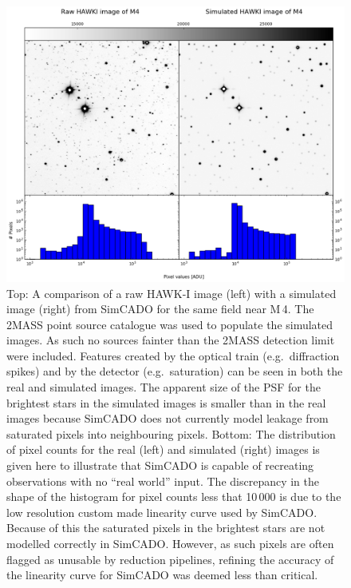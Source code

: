 \begin{figure}

    \centering
    \includegraphics[width=\textwidth]{images/hawki_simcado_side_by_side}
    
    \caption{Top: A comparison of a raw HAWK-I image (left) with a simulated image (right) from SimCADO for the same field near M\,4. The 2MASS point source catalogue was used to populate the simulated images. As such no sources fainter than the 2MASS detection limit were included. Features created by the optical train (e.g.~diffraction spikes) and by the detector (e.g.~saturation) can be seen in both the real and simulated images. The apparent size of the PSF for the brightest stars in the simulated images is smaller than in the real images because SimCADO does not currently model leakage from saturated pixels into neighbouring pixels. Bottom: The distribution of pixel counts for the real (left) and simulated (right) images is given here to illustrate that SimCADO is capable of recreating observations with no ``real world'' input. The discrepancy in the shape of the histogram for pixel counts less that 10\,000 is due to the low resolution custom made linearity curve used by SimCADO. Because of this the saturated pixels in the brightest stars are not modelled correctly in SimCADO. However, as such pixels are often flagged as unusable by reduction pipelines, refining the accuracy of the linearity curve for SimCADO was deemed less than critical.}
    \label{fig:img_comparison}
    
\end{figure}


